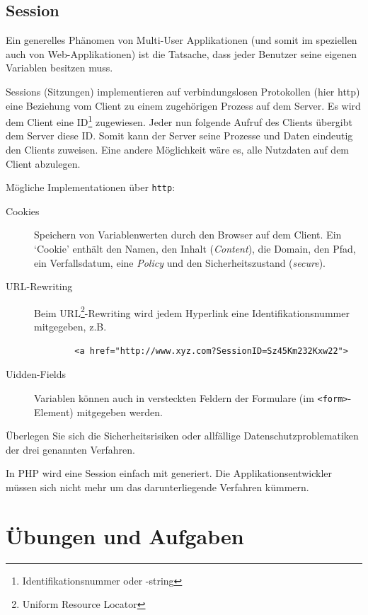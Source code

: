 \subsection{Session}
\label{subsec:session}

Ein generelles Phänomen von Multi-User Applikationen (und somit im speziellen auch
von Web-Applikationen) ist die Tatsache, dass jeder Benutzer seine eigenen Variablen
besitzen muss.

Sessions (Sitzungen) implementieren auf verbindungslosen Protokollen (hier http) eine
Beziehung vom Client zu einem zugehörigen Prozess auf dem Server. Es wird dem Client eine
ID\footnote{Identifikationsnummer oder -string} zugewiesen. Jeder nun folgende Aufruf des
Clients übergibt dem Server diese ID. Somit kann der Server seine Prozesse und Daten eindeutig
den Clients zuweisen. Eine andere Möglichkeit wäre es, alle Nutzdaten auf dem Client abzulegen.

Mögliche Implementationen über \texttt{http}:
\begin{description}
    \item[Cookies] Speichern von Variablenwerten durch den Browser auf dem Client.
    Ein `Cookie' enthält den Namen, den Inhalt (\emph{Content}), die Domain, den Pfad, ein
    Verfallsdatum, eine \emph{Policy} und den Sicherheitszustand (\emph{secure}).

    \item[URL-Rewriting] Beim URL\footnote{Uniform Resource Locator}-Rewriting wird jedem
    Hyperlink eine Identifikationsnummer mitgegeben, z.B.

    \begin{verbatim}
        <a href="http://www.xyz.com?SessionID=Sz45Km232Kxw22">
    \end{verbatim}

    \item[Uidden-Fields] Variablen können auch in versteckten Feldern der
    Formulare (im \texttt{<form>}-Element) mitgegeben werden.
\end{description}

Überlegen Sie sich die Sicherheitsrisiken oder allfällige Datenschutzproblematiken der
drei genannten Verfahren.

In PHP wird eine Session einfach mit  generiert.
Die Applikationsentwickler müssen sich nicht mehr um das darunterliegende Verfahren kümmern.

\section{Übungen und Aufgaben}
\label{sec:uebungen}

